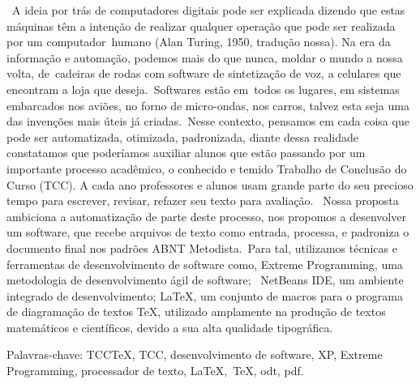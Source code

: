 \begin{resumo}
{
\ A ideia por tr\'as de computadores digitais pode ser explicada dizendo que estas m\'aquinas t\^em a inten\c{c}\~ao de
realizar qualquer opera\c{c}\~ao que pode ser realizada por um computador\ humano (Alan Turing, 1950, tradu\c{c}\~ao
nossa). Na era da informa\c{c}\~ao e automa\c{c}\~ao, podemos mais do que nunca, moldar o mundo a nossa volta,
de\ cadeiras de rodas com software de sintetiza\c{c}\~ao de voz, a celulares que encontram a loja que
deseja.\ Softwares est\~ao em\ todos os lugares, em sistemas embarcados nos avi\~oes, no forno de micro-ondas, nos
carros, talvez esta seja uma das inven\c{c}\~oes mais \'uteis j\'a criadas.\ Nesse contexto, pensamos em cada coisa que
pode ser automatizada, otimizada, padronizada, diante dessa realidade constatamos que poder\'iamos auxiliar alunos que
est\~ao passando por um importante processo acad\^emico, o conhecido e temido Trabalho de Conclus\~ao do Curso (TCC). A
cada ano professores e alunos usam grande parte do seu precioso tempo para escrever, revisar, refazer seu texto para
avalia\c{c}\~ao. \ Nossa proposta ambiciona a automatiza\c{c}\~ao de parte deste processo, nos propomos a desenvolver
um software, que recebe arquivos de texto como entrada, processa, e padroniza o documento final nos padr\~oes ABNT
Metodista.\ Para tal, utilizamos t\'ecnicas e ferramentas de desenvolvimento de software como, Extreme Programming, uma
metodologia de desenvolvimento \'agil de software; \ NetBeans IDE, um ambiente integrado de desenvolvimento; {\LaTeX},
um conjunto de macros para o programa de diagrama\c{c}\~ao de textos TeX, utilizado amplamente na produ\c{c}\~ao de
textos matem\'aticos e cient\'ificos, devido a sua alta qualidade tipogr\'afica.\ }


\bigskip

{
Palavras-chave: TCCTeX, TCC, desenvolvimento de software, XP, Extreme Programming, processador de texto, {\LaTeX},\ TeX,
odt, pdf.}


\bigskip

\end{resumo}